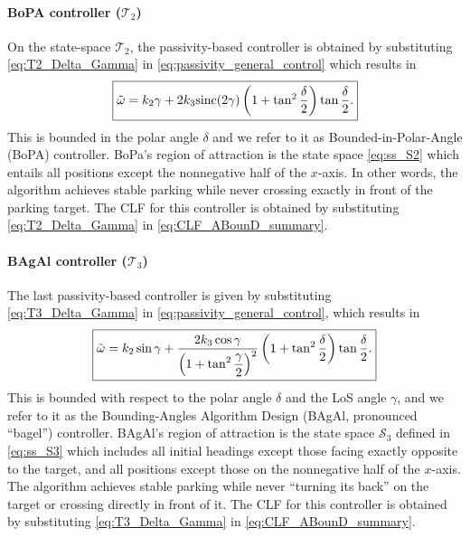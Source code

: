 \documentclass[journal,twoside,web]{ieeecolor}
\theoremstyle{definition}
\newcommand{\abs}[1]{\left\lvert#1\right\rvert}
\begin{document}
\paragraph{BoPA controller ($\mathcal{T}_2$)}
On the state-space $\mathcal{T}_2$, the passivity-based controller is obtained by substituting \eqref{eq:T2_Delta_Gamma} in \eqref{eq:passivity_general_control} which results in
\begin{equation}
\label{eq:Bopa_controller}
\fbox{$\tilde\omega = k_2\gamma + 2k_3 \mbox{sinc}(2\gamma) \left(1+\tan^2 \dfrac{\delta}{2} \right)\tan \dfrac{\delta}{2}$.}
\end{equation}
This is bounded in the polar angle $\delta$ and we refer to it as Bounded-in-Polar-Angle (BoPA) controller. BoPa's region of attraction is the state space \eqref{eq:ss_S2}
which entails all positions except the nonnegative half of the $x$-axis. In other words, the algorithm achieves stable parking while never crossing exactly in front of the parking target. 
The CLF for this controller is obtained by substituting \eqref{eq:T2_Delta_Gamma} in \eqref{eq:CLF_ABounD_summary}.

\paragraph{BAgAl controller ($\mathcal{T}_3$)} The last passivity-based controller is given by substituting \eqref{eq:T3_Delta_Gamma} in  \eqref{eq:passivity_general_control}, which results in
\begin{equation}
\label{eq-control-bounded-in-gamma-delta}
\fbox{$\tilde\omega = k_2\sin\gamma +  \displaystyle
\frac{ 2k_3\cos\gamma }{\left(1+\displaystyle\tan^2\frac{\gamma}{2}\right)^2} \left(1+\tan^2 \frac{\delta}{2} \right)\tan \frac{\delta}{2}$.}
\end{equation}
This is bounded with respect to the polar angle $\delta$ and the LoS angle $\gamma$, and we refer to it as the Bounding-Angles Algorithm Design (BAgAl, pronounced “bagel”) controller. BAgAl's region of attraction is the state space $\mathcal{S}_3$ defined in \eqref{eq:ss_S3}
which includes all initial headings except those facing exactly opposite to the target, and all positions except those on the nonnegative half of the $x$-axis. The algorithm achieves stable parking while never “turning its back” on the target or crossing directly in front of it.
The CLF for this controller is obtained by substituting \eqref{eq:T3_Delta_Gamma} in \eqref{eq:CLF_ABounD_summary}.
\end{document}
